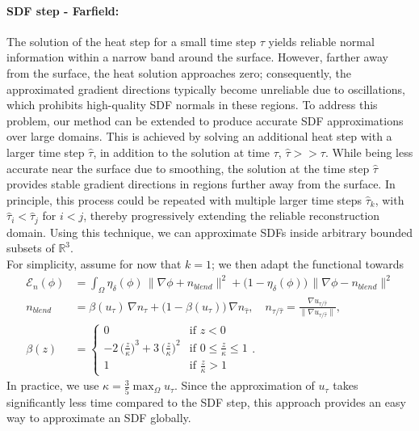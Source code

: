 \documentclass[draft,12pt,openany]{book}
\newcommand{\R}{\mathbb{R}}
\theoremstyle{plainnormal}
\theoremstyle{remark}
\begin{document}
\paragraph{SDF step - Farfield:}
The solution of the heat step for a small time step $\tau$ yields reliable normal information within a narrow band around the surface. However, farther away from the surface, the heat solution approaches zero; consequently, the approximated gradient directions typically become unreliable due to oscillations, which prohibits high-quality SDF normals in these regions. To address this problem, our method can be extended to produce accurate SDF approximations over large domains. This is achieved by solving an additional heat step with a larger time step $\hat{\tau}$, in addition to the solution at time $\tau$, $\hat \tau >> \tau$. While being less accurate near the surface due to smoothing, the solution at the time step $\hat \tau$ provides stable gradient directions in regions further away from the surface. In principle, this process could be repeated with multiple larger time steps $\hat{\tau}_k$, with $\hat{\tau}_i < \hat{\tau}_j$ for $i < j$, thereby progressively extending the reliable reconstruction domain. Using this technique, we can approximate SDFs inside arbitrary bounded subsets of $\R^3$.\\
For simplicity, assume for now that $k = 1$; we then adapt the functional towards 
\begin{align*}
    \mathcal{E}_n (\phi)&= \int_\Omega \eta_\delta(\phi)\, \|\nabla \phi + n_{blend}\|^2 + \big(1 - \eta_\delta(\phi)\big)\,\|\nabla \phi - n_{blend}\|^2 \\  n_{blend} &= \beta(u_\tau)\, \nabla n_\tau + \big(1-\beta(u_\tau)\big)\,\nabla n_{\hat \tau}, \quad n_{\tau/ \hat \tau} = \frac{\nabla u_{\tau/ \hat \tau}}{\|\nabla u_{\tau/ \hat \tau}\|}, \\\beta(z) &= \begin{cases}
0 & \text{if } z < 0 \\
-2\,\big(\frac{z}{\kappa}\big)^3 + 3\, \big(\frac{z}{\kappa}\big)^2 & \text{if } 0 \leq \frac{z}{\kappa} \leq 1 \\
1 & \text{if } \frac{z}{\kappa} > 1
\end{cases}.
\end{align*} 
In practice, we use $\kappa = \frac{3}{5} \max_\Omega u_\tau $. Since the approximation of $u_\tau$ takes significantly less time compared to the SDF step, this approach provides an easy way to approximate an SDF globally.\\
\end{document}
